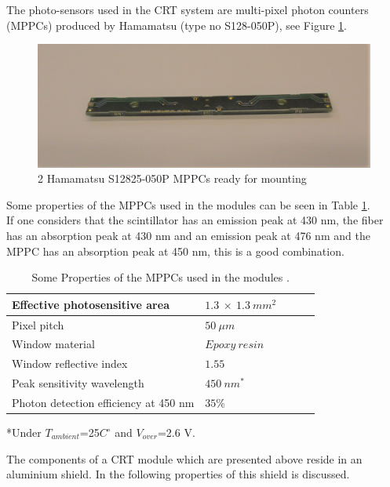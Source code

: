 \documentclass[a4paper]{article}\linespread{1.4}
\begin{document}
The photo-sensors used in the CRT system are multi-pixel photon counters (MPPCs) produced by Hamamatsu  (type no S128-050P), see Figure \ref{fig:mppc}. 
\begin{figure}[h!] \centering \includegraphics[width=120mm,scale=1.0]{mppcpaint.png} \caption{2 Hamamatsu S12825-050P MPPCs ready for mounting} \label{fig:mppc}\end{figure}  
Some properties of the MPPCs used in the modules can be seen in Table \ref{tab:pprr}.
\\If one considers that the scintillator has an emission peak at 430 nm, the fiber has an absorption peak at 430 nm and an emission peak at 476 nm and the MPPC has an absorption peak at 450 nm, this is a good combination.
\begin{table}
     \centering
    \caption{Some Properties of the MPPCs used in the modules \cite{hama}. }
     \begin{tabular}{| l | l | l  | l | l |}
        \hline \hline 
        Effective photosensitive area & \(1.3\ \times \ 1.3 \ mm^{2} \)  \\     \hline 
        Pixel pitch & \( 50 \ \mu m \) \\      \hline 
        Window material& \( Epoxy\ resin \)  \\     \hline 
        Window reflective index & \( 1.55 \) \\      \hline
        Peak sensitivity wavelength & \( 450 \ nm ^{*}  \)  \\     \hline 
        Photon detection efficiency at 450 nm & \( 35 \% \) \\      \hline
 \end{tabular}
\label{tab:pprr}

\vspace{1ex}
\raggedright{*Under $T_{ambient}$=25$C^{\circ}$ and $V_{over}$=2.6 V.}
\centering
\end{table}

The components of a CRT module which are presented above reside in an aluminium shield. In the following properties of this shield is discussed.
\end{document}
